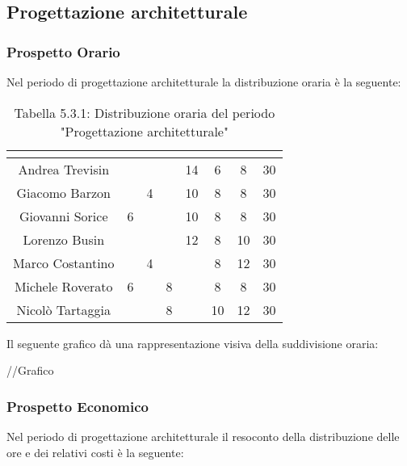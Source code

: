 \subsection{Progettazione architetturale}

\subsubsection{Prospetto Orario}
Nel periodo di progettazione architetturale la distribuzione oraria è la seguente:

\renewcommand{\arraystretch}{1.5}
\begin{table}[H]
\begin{center}
\begin{tabular}{|c|c|c|c|c|c|c|c|}
\hline
\rowcolor{title_row}
\textbf{\color{title_text}{Nome}} & \textbf{\color{title_text}{Resp.}} & \textbf{\color{title_text}{Ammi.}} & \textbf{\color{title_text}{Analist.}} & \textbf{\color{title_text}{Progett.}} & \textbf{\color{title_text}{Program.}} & \textbf{\color{title_text}{Verific.}} & \textbf{\color{title_text}{Totale}} \\ \hline
Andrea Trevisin  & & & & 14 & 6 & 8 & 30 \\ \hline
Giacomo Barzon   &  & 4 &  & 10 & 8 & 8 & 30\\ \hline
Giovanni Sorice  & 6 &  &  & 10 & 8 & 8 & 30\\ \hline
Lorenzo Busin    &  &  &  & 12 & 8 & 10 & 30\\ \hline
Marco Costantino &  & 4 &  &  & 8 & 12 & 30\\ \hline
Michele Roverato & 6 &  & 8 &  & 8 & 8 & 30\\ \hline
Nicolò Tartaggia &  &  & 8 &  & 10 & 12 & 30\\ \hline
\end{tabular}
\caption{Tabella 5.3.1: Distribuzione oraria del periodo "Progettazione architetturale"\label{}}
\end{center}
\end{table}
\renewcommand{\arraystretch}{1}

Il seguente grafico dà una rappresentazione visiva della suddivisione oraria: \\
\begin{center}
//Grafico
\end{center}


\subsubsection{Prospetto Economico}
Nel periodo di progettazione architetturale il resoconto della distribuzione delle ore e dei relativi costi è la seguente:

